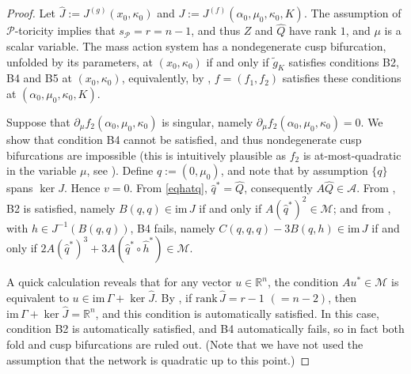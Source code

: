 \documentclass[11pt]{amsart}
\renewcommand{\k}{\kappa}
\newcommand{\R}{\mathbb{R}}
\newcommand{\wQ}{\widehat{Q}}
\newcommand{\wJ}{\hat{J}}
\newcommand{\mA}{\mathcal{A}}
\newcommand{\mP}{\mathcal{P}}
\newcommand{\mM}{\mathcal{M}}
\theoremstyle{definition}
\begin{document}
\begin{proof}
Let $\wJ:= J^{(g)}(x_0, \k_0)$ and $J:= J^{(f)}(\alpha_0, \mu_0, \k_0, K)$. The assumption of $\mP$-toricity implies that $s_\mP = r = n-1$, and thus $Z$ and $\wQ$ have rank $1$, and $\mu$ is a scalar variable. The mass action system has a nondegenerate cusp bifurcation, unfolded by its parameters, at $(x_0, \k_0)$ if and only if $\tilde{g}_K$ satisfies conditions B2, B4 and B5 at $(x_0, \k_0)$, equivalently, by , $f=(f_1, f_2)$ satisfies these conditions at $(\alpha_0, \mu_0, \k_0, K)$. 

Suppose that $\partial_\mu f_2(\alpha_0, \mu_0, \k_0)$ is singular, namely $\partial_\mu f_2(\alpha_0, \mu_0, \k_0)=0$. We show that condition B4 cannot be satisfied, and thus nondegenerate cusp bifurcations are impossible (this is intuitively plausible as $f_2$ is at-most-quadratic in the variable $\mu$, see \cite[Proposition 5.13]{banajifeliu26}). Define $q := (0, \mu_0)$, and note that by assumption $\{q\}$ spans $\ker J$. Hence $v=0$. From \eqref{eqhatq}, $\hat{q}^* = \wQ$, consequently $A\wQ \in \mA$. From , B2 is satisfied, namely $B(q,q) \in \mathrm{im}\,J$ if and only if $A(\hat{q}^*)^2 \in \mM$; and from , with $h \in J^{-1}(B(q,q))$, B4 fails, namely $C(q,q,q) - 3B(q,h) \in \mathrm{im}\,J$ if and only if $2A(\hat{q}^*)^3 + 3A(\hat{q}^*\circ \hat{h}^*) \in \mM$.

A quick calculation reveals that for any vector $u \in \R^n$, the condition $A u^* \in \mM$ is equivalent to $u \in \mathrm{im}\,\Gamma + \ker \wJ$. By , if $\mathrm{rank}\,\wJ = r-1\,\, (= n-2)$, then $\mathrm{im}\,\Gamma + \ker \wJ = \R^n$, and this condition is automatically satisfied. In this case, condition B2 is automatically satisfied, and B4 automatically fails, so in fact both fold and cusp bifurcations are ruled out. (Note that we have not used the assumption that the network is quadratic up to this point.) 


\end{proof}
\end{document}
